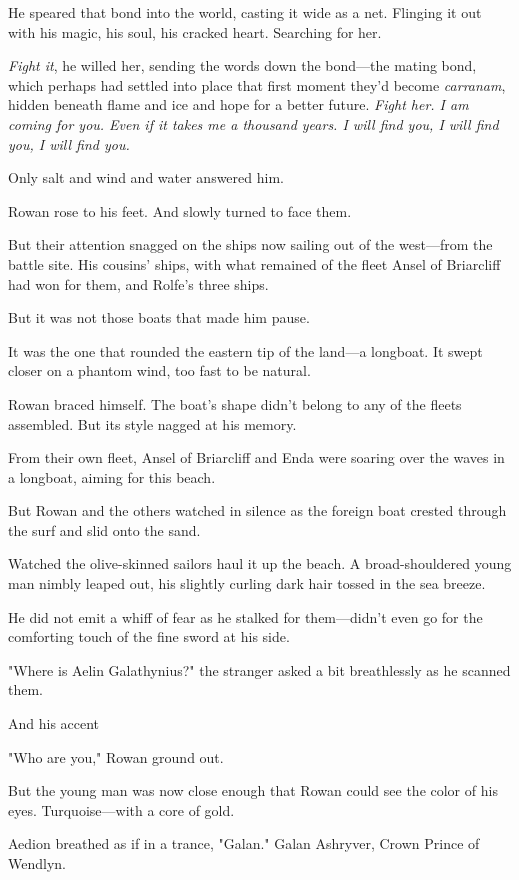 He speared that bond into the world, casting it wide as a net. Flinging it out with his magic, his soul, his cracked heart. Searching for her.

\emph{Fight it}, he willed her, sending the words down the bond---the mating bond, which perhaps had settled into place that first moment they'd become \emph{carranam}, hidden beneath flame and ice and hope for a better future. \emph{Fight her. I am coming for you. Even if it takes me a thousand years. I will find you, I will find you, I will find you.}

Only salt and wind and water answered him.

Rowan rose to his feet. And slowly turned to face them.

But their attention snagged on the ships now sailing out of the west---from the battle site. His cousins' ships, with what remained of the fleet Ansel of Briarcliff had won for them, and Rolfe's three ships.

But it was not those boats that made him pause.

It was the one that rounded the eastern tip of the land---a longboat. It swept closer on a phantom wind, too fast to be natural.

Rowan braced himself. The boat's shape didn't belong to any of the fleets assembled. But its style nagged at his memory.

From their own fleet, Ansel of Briarcliff and Enda were soaring over the waves in a longboat, aiming for this beach.

But Rowan and the others watched in silence as the foreign boat crested through the surf and slid onto the sand.

Watched the olive-skinned sailors haul it up the beach. A broad-shouldered young man nimbly leaped out, his slightly curling dark hair tossed in the sea breeze.

He did not emit a whiff of fear as he stalked for them---didn't even go for the comforting touch of the fine sword at his side.

"Where is Aelin Galathynius?" the stranger asked a bit breathlessly as he scanned them.

And his accent 

"Who are you," Rowan ground out.

But the young man was now close enough that Rowan could see the color of his eyes. Turquoise---with a core of gold.

Aedion breathed as if in a trance, "Galan." Galan Ashryver, Crown Prince of Wendlyn.

